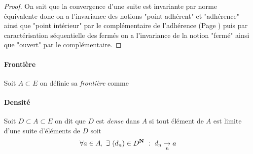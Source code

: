 		 \medskip
		
		
		\begin{proof}
		On sait que la convergence d'une suite est invariante par norme équivalente %
		donc on a l'invariance des notions "point adhérent" et "adhérence" ainsi que "point intérieur" par le complémentaire de l'adhérence (Page \pageref{2.1.5}) puis par 
		caractérisation séquentielle des fermés on a l'invariance de la notion "fermé" ainsi que "ouvert" par le complémentaire.
		\end{proof}
		
		
		\traitd
		\paragraph{Frontière}
		Soit $A\subset E$ on définie sa \emph{frontière} comme  
		\trait
		
				\newpage
		
		
		\traitd
		\paragraph{Densité}
			Soit $D\subset A\subset E$ on dit que $D$ est \emph{dense} dans $A$ si tout élément de $A$ est limite d'une suite d'éléments de $D$ soit 
			\[
				\forall a\in A ,~\exists ~\suite{d} \in D^{\mathbf{N}} ~:~d_n\underset{n}{\to} a
			\vspace{-20pt}
			\] 
		\trait
		
